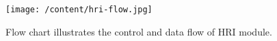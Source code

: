 \begin{figure}
	[h] \centering 
	\texttt{[image: /content/hri-flow.jpg]} \caption{Flow chart illustrates the control and data flow of HRI module. } \label{fg:hri:flow} 
\end{figure}
